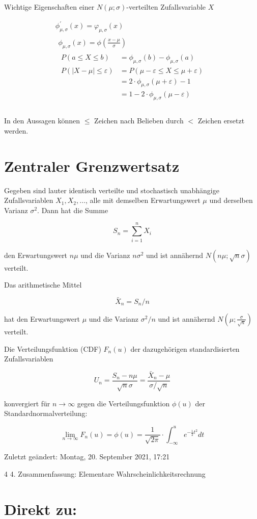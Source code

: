 \documentclass[10pt]{article}
\begin{document}
Wichtige Eigenschaften einer $N(\mu ; \sigma)$-verteilten Zufallsvariable $X$

$$
\begin{aligned}
& \phi_{\mu, \sigma}^{\prime}(x)=\varphi_{\mu, \sigma}(x) \\
& \begin{aligned}
\phi_{\mu, \sigma}(x)=\phi\left(\frac{x-\mu}{\sigma}\right) \\
\begin{aligned}
P(a \leq X \leq b) & =\phi_{\mu, \sigma}(b)-\phi_{\mu, \sigma}(a) \\
P(|X-\mu| \leq \varepsilon) & =P(\mu-\varepsilon \leq X \leq \mu+\varepsilon) \\
& =2 \cdot \phi_{\mu, \sigma}(\mu+\varepsilon)-1 \\
& =1-2 \cdot \phi_{\mu, \sigma}(\mu-\varepsilon)
\end{aligned}
\end{aligned} \begin{aligned}
\end{aligned} \\
&
\end{aligned}
$$

In den Aussagen können $\leq$ Zeichen nach Belieben durch $<$ Zeichen ersetzt werden.

\section*{Zentraler Grenzwertsatz}
Gegeben sind lauter identisch verteilte und stochastisch unabhängige Zufallsvariablen $X_{1}, X_{2}, \ldots$, alle mit demselben Erwartungswert $\mu$ und derselben Varianz $\sigma^{2}$. Dann hat die Summe

$$
S_{n}=\sum_{i=1}^{n} X_{i}
$$

den Erwartungswert $n \mu$ und die Varianz $n \sigma^{2}$ und ist annähernd $N(n \mu ; \sqrt{n} \sigma)$ verteilt.

Das arithmetische Mittel

$$
\bar{X}_{n}=S_{n} / n
$$

hat den Erwartungswert $\mu$ und die Varianz $\sigma^{2} / n$ und ist annähernd $N\left(\mu ; \frac{\sigma}{\sqrt{n}}\right)$ verteilt.

Die Verteilungsfunktion (CDF) $F_{n}(u)$ der dazugehörigen standardisierten\\
Zufallsvariablen

$$
U_{n}=\frac{S_{n}-n \mu}{\sqrt{n} \sigma}=\frac{\bar{X}_{n}-\mu}{\sigma / \sqrt{n}}
$$

konvergiert für $n \rightarrow \infty$ gegen die Verteilungsfunktion $\phi(u)$ der\\
Standardnormalverteilung:

$$
\lim _{n \rightarrow \infty} F_{n}(u)=\phi(u)=\frac{1}{\sqrt{2 \pi}} \cdot \int_{-\infty}^{u} e^{-\frac{1}{2} t^{2}} d t
$$

Zuletzt geändert: Montag, 20. September 2021, 17:21

4 4. Zusammenfassung: Elementare Wahrscheinlichkeitsrechnung

\section*{Direkt zu:}
\end{document}
